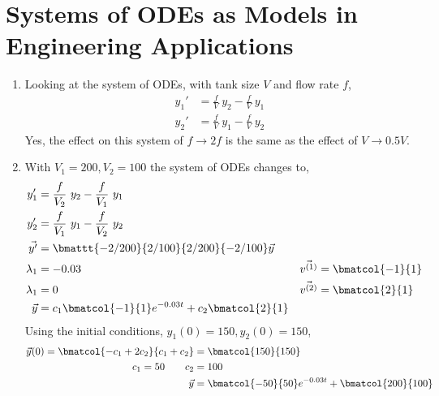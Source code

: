 \section{Systems of ODEs as Models in Engineering Applications}
\begin{enumerate}
    \item Looking at the system of ODEs, with tank size $ V $ and flow rate $ f $,
          \begin{align}
              y_1' & = \frac{f}{V}\ y_2 - \frac{f}{V}\ y_1 \\
              y_2' & = \frac{f}{V}\ y_1 - \frac{f}{V}\ y_2
          \end{align}
          {\color{y_h} Yes}, the effect on this system of $ f \to 2f $ is
          the same as the effect of $ V \to 0.5V $.

    \item With $ V_1 = 200, V_2 = 100 $ the system of ODEs changes to,
          \begin{align}
              y_1'          & = \frac{f}{V_2}\ y_2 - \frac{f}{V_1}\ y_1               \\
              y_2'          & = \frac{f}{V_1}\ y_1 - \frac{f}{V_2}\ y_2               \\
              \vec{y'}      & = \bmattt{-2/200}{2/100}{2/200}{-2/100} \vec{y}         \\
              \lambda_1     & = -0.03                                               &
              \vec{v^{(1)}} & = \bmatcol{-1}{1}                                       \\
              \lambda_1     & = 0                                                   &
              \vec{v^{(2)}} & = \bmatcol{2}{1}                                        \\
              \vec{y}       & = c_1 \bmatcol{-1}{1} e^{-0.03t} + c_2 \bmatcol{2}{1}
          \end{align}
          Using the initial conditions, $ y_1(0) = 150, y_2(0) = 150 $,
          \begin{align}
              \vec{y}(0)= \bmatcol{-c_1 + 2c_2}{c_1 + c_2} & = \bmatcol{150}{150} \\
              c_1 = 50 \qquad c_2                          & = 100                \\
              \vec{y}                                      & =
              \bmatcol{-50}{50}e^{-0.03t} + \bmatcol{200}{100}
          \end{align}
          \begin{figure}[H]

\end{figure}
\end{enumerate}
